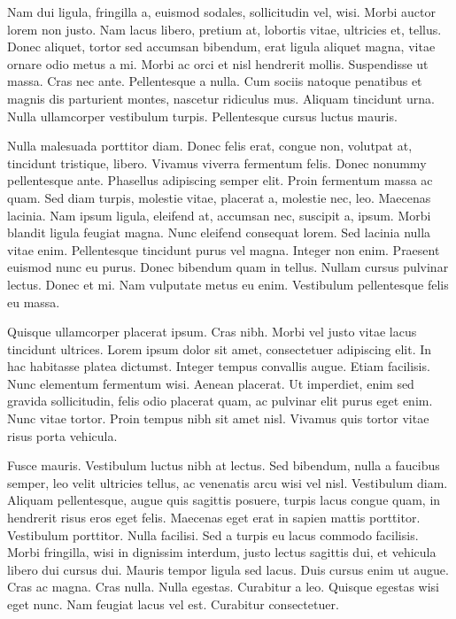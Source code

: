 Nam dui ligula, fringilla a, euismod sodales, sollicitudin vel, wisi. Morbi auctor
lorem non justo. Nam lacus libero, pretium at, lobortis vitae, ultricies et, tellus.
Donec aliquet, tortor sed accumsan bibendum, erat ligula aliquet magna, vitae
ornare odio metus a mi. Morbi ac orci et nisl hendrerit mollis. Suspendisse ut
massa. Cras nec ante. Pellentesque a nulla. Cum sociis natoque penatibus et
magnis dis parturient montes, nascetur ridiculus mus. Aliquam tincidunt urna.
Nulla ullamcorper vestibulum turpis. Pellentesque cursus luctus mauris.

Nulla malesuada porttitor diam. Donec felis erat, congue non, volutpat at,
tincidunt tristique, libero. Vivamus viverra fermentum felis. Donec nonummy
pellentesque ante. Phasellus adipiscing semper elit. Proin fermentum massa ac
quam. Sed diam turpis, molestie vitae, placerat a, molestie nec, leo. Maecenas
lacinia. Nam ipsum ligula, eleifend at, accumsan nec, suscipit a, ipsum. Morbi
blandit ligula feugiat magna. Nunc eleifend consequat lorem. Sed lacinia nulla
vitae enim. Pellentesque tincidunt purus vel magna. Integer non enim. Praesent
euismod nunc eu purus. Donec bibendum quam in tellus. Nullam cursus pulvinar lectus.
Donec et mi. Nam vulputate metus eu enim. Vestibulum pellentesque felis eu massa.

Quisque ullamcorper placerat ipsum. Cras nibh. Morbi vel justo vitae lacus
tincidunt ultrices. Lorem ipsum dolor sit amet, consectetuer adipiscing elit. In
hac habitasse platea dictumst. Integer tempus convallis augue. Etiam facilisis.
Nunc elementum fermentum wisi. Aenean placerat. Ut imperdiet, enim sed
gravida sollicitudin, felis odio placerat quam, ac pulvinar elit purus eget enim.
Nunc vitae tortor. Proin tempus nibh sit amet nisl. Vivamus quis tortor vitae
risus porta vehicula.

Fusce mauris. Vestibulum luctus nibh at lectus. Sed bibendum, nulla a faucibus
semper, leo velit ultricies tellus, ac venenatis arcu wisi vel nisl. Vestibulum
diam. Aliquam pellentesque, augue quis sagittis posuere, turpis lacus congue
quam, in hendrerit risus eros eget felis. Maecenas eget erat in sapien mattis
porttitor. Vestibulum porttitor. Nulla facilisi. Sed a turpis eu lacus commodo
facilisis. Morbi fringilla, wisi in dignissim interdum, justo lectus sagittis dui, et
vehicula libero dui cursus dui. Mauris tempor ligula sed lacus. Duis cursus enim
ut augue. Cras ac magna. Cras nulla. Nulla egestas. Curabitur a leo. Quisque
egestas wisi eget nunc. Nam feugiat lacus vel est. Curabitur consectetuer.

